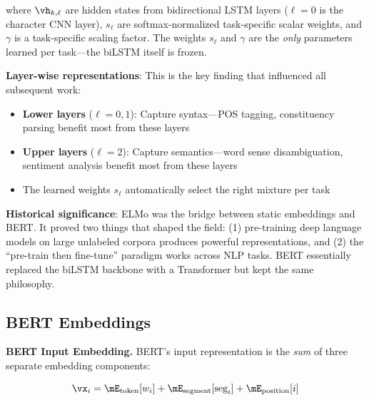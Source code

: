 where $\vh_{k,\ell}$ are hidden states from bidirectional LSTM layers ($\ell = 0$ is the character CNN layer), $s_\ell$ are softmax-normalized task-specific scalar weights, and $\gamma$ is a task-specific scaling factor. The weights $s_\ell$ and $\gamma$ are the \emph{only} parameters learned per task---the biLSTM itself is frozen.

\textbf{Layer-wise representations}: This is the key finding that influenced all subsequent work:
\begin{itemize}
    \item \textbf{Lower layers} ($\ell = 0, 1$): Capture syntax---POS tagging, constituency parsing benefit most from these layers
    \item \textbf{Upper layers} ($\ell = 2$): Capture semantics---word sense disambiguation, sentiment analysis benefit most from these layers
    \item The learned weights $s_\ell$ automatically select the right mixture per task
\end{itemize}

\textbf{Historical significance}: ELMo was the bridge between static embeddings and BERT. It proved two things that shaped the field: (1) pre-training deep language models on large unlabeled corpora produces powerful representations, and (2) the ``pre-train then fine-tune'' paradigm works across NLP tasks. BERT essentially replaced the biLSTM backbone with a Transformer but kept the same philosophy.

\subsection{BERT Embeddings}

\textbf{BERT Input Embedding.} BERT's input representation is the \emph{sum} of three separate embedding components:

\begin{equation}
\vx_i = \mE_{\text{token}}[w_i] + \mE_{\text{segment}}[\text{seg}_i] + \mE_{\text{position}}[i]
\end{equation}

